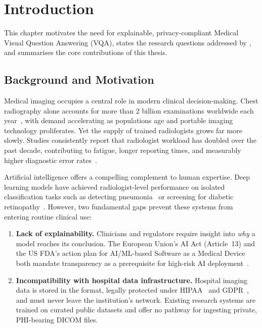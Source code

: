 \chapter{Introduction}
\label{ch:intro}

\begin{infobox}
This chapter motivates the need for explainable, privacy-compliant Medical
Visual Question Answering (VQA), states the research questions addressed by
\medxplain, and summarises the core contributions of this thesis.
\end{infobox}

\section{Background and Motivation}
\label{sec:motivation}

Medical imaging occupies a central role in modern clinical decision-making.
Chest radiography alone accounts for more than 2 billion examinations
worldwide each year~\citep{who2020xray}, with demand accelerating as
populations age and portable imaging technology proliferates. Yet the supply
of trained radiologists grows far more slowly. Studies consistently report
that radiologist workload has doubled over the past decade, contributing to
fatigue, longer reporting times, and measurably higher diagnostic error
rates~\citep{reiner2012radiology}.

Artificial intelligence offers a compelling complement to human expertise.
Deep learning models have achieved radiologist-level performance on isolated
classification tasks such as detecting pneumonia~\citep{rajpurkar2017chexnet}
or screening for diabetic retinopathy~\citep{gulshan2016retina}. However,
two fundamental gaps prevent these systems from entering routine clinical use:

\begin{enumerate}[label=\arabic*.]
  \item \textbf{Lack of explainability.} Clinicians and regulators require
        insight into \emph{why} a model reaches its conclusion.
        The European Union's AI Act (Article~13) and the US FDA's action plan
        for AI/ML-based Software as a Medical Device both mandate transparency
        as a prerequisite for high-risk AI deployment~\citep{euaiact,fda2021ai}.
  \item \textbf{Incompatibility with hospital data infrastructure.}
        Hospital imaging data is stored in the \dicom{} format, legally
        protected under HIPAA~\citep{hipaa} and GDPR~\citep{gdpr}, and must
        never leave the institution's network. Existing research systems are
        trained on curated public datasets and offer no pathway for ingesting
        private, PHI-bearing DICOM files.
\end{enumerate}

